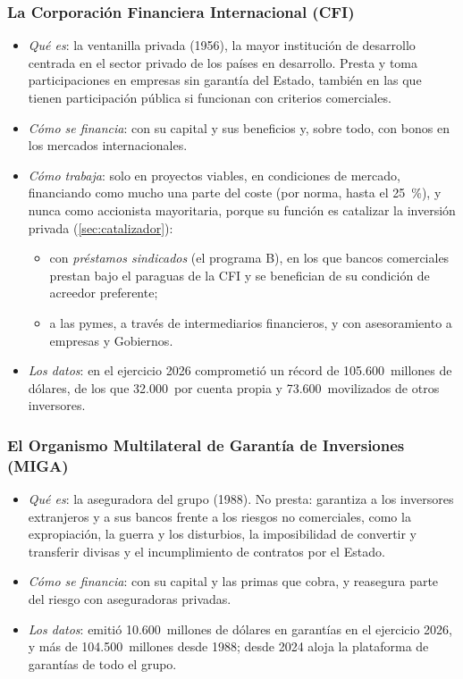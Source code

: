 \documentclass[11pt]{article}
\begin{document}
\subsubsection{La Corporación Financiera Internacional (CFI)}\label{sec:cfi}

\begin{itemize}
\item \emph{Qué es}: la ventanilla privada (1956), la mayor institución de desarrollo centrada en el sector privado de los países en desarrollo. Presta y toma participaciones en empresas sin garantía del Estado, también en las que tienen participación pública si funcionan con criterios comerciales.
\item \emph{Cómo se financia}: con su capital y sus beneficios y, sobre todo, con bonos en los mercados internacionales.
\item \emph{Cómo trabaja}: solo en proyectos viables, en condiciones de mercado, financiando como mucho una parte del coste (por norma, hasta el 25~\%), y nunca como accionista mayoritaria, porque su función es catalizar la inversión privada (\ref{sec:catalizador}):
  \begin{itemize}
  \item con \emph{préstamos sindicados} (el programa B), en los que bancos comerciales prestan bajo el paraguas de la CFI y se benefician de su condición de acreedor preferente;
  \item a las pymes, a través de intermediarios financieros, y con asesoramiento a empresas y Gobiernos.
  \end{itemize}
\item \emph{Los datos}: en el ejercicio 2026 comprometió un récord de 105.600~millones de dólares, de los que 32.000~por cuenta propia y 73.600~movilizados de otros inversores\nocite{BM2026InformeAnual}.
\end{itemize}

\subsubsection{El Organismo Multilateral de Garantía de Inversiones (MIGA)}\label{sec:miga}

\begin{itemize}
\item \emph{Qué es}: la aseguradora del grupo (1988). No presta: garantiza a los inversores extranjeros y a sus bancos frente a los riesgos no comerciales, como la expropiación, la guerra y los disturbios, la imposibilidad de convertir y transferir divisas y el incumplimiento de contratos por el Estado.
\item \emph{Cómo se financia}: con su capital y las primas que cobra, y reasegura parte del riesgo con aseguradoras privadas.
\item \emph{Los datos}: emitió 10.600~millones de dólares en garantías en el ejercicio 2026, y más de 104.500~millones desde 1988; desde 2024 aloja la plataforma de garantías de todo el grupo\nocite{BM2026InformeAnual}.
\end{itemize}
\end{document}
